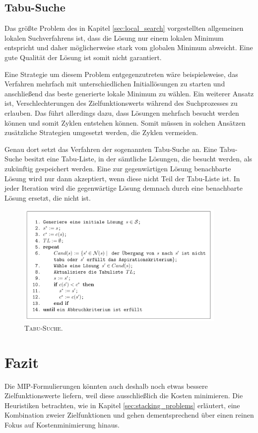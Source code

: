\pagebreak

\subsection{Tabu-Suche}
\label{sec:tabu_seach}

Das größte Problem des in Kapitel \ref{sec:local_search} vorgestellten allgemeinen lokalen Suchverfahrens
ist, dass die Lösung nur einem lokalen Minimum entspricht und daher möglicherweise stark vom globalen
Minimum abweicht. Eine gute Qualität der Lösung ist somit nicht garantiert.

Eine Strategie um diesem Problem entgegenzutreten wäre beispielsweise, das Verfahren mehrfach mit unterschiedlichen
Initiallösungen zu starten und anschließend das beste generierte lokale Minimum zu wählen.
Ein weiterer Ansatz ist, Verschlechterungen des Zielfunktionswerts während des Suchprozesses zu erlauben.
Das führt allerdings dazu, dass Lösungen mehrfach besucht werden können und somit Zyklen entstehen können.
Somit müssen in solchen Ansätzen zusätzliche Strategien umgesetzt werden, die Zyklen vermeiden. \cite{Brucker2006}

Genau dort setzt das Verfahren der sogenannten Tabu-Suche an. Eine Tabu-Suche besitzt eine Tabu-Liste,
in der sämtliche Lösungen, die besucht werden, als zukünftig  gespeichert werden.
Eine zur gegenwärtigen Lösung benachbarte Lösung wird nur dann akzeptiert, wenn diese nicht Teil der Tabu-Liste ist.
In jeder Iteration wird die gegenwärtige Lösung demnach durch eine benachbarte Lösung ersetzt, die nicht  ist.

\begin{figure}[H]
\centering
\includegraphics[width=0.9\textwidth]{img/tabu_search_algo_placeholder.png}
\caption{\textsc{Tabu-Suche. \cite{Knust2017}}}
\label{fig:local_search_weakness}
\end{figure}

\pagebreak

\section{Fazit}
\label{sec:conclusion}

Die MIP-Formulierungen könnten auch deshalb noch etwas bessere Zielfunktionswerte liefern, weil
diese ausschließlich die Kosten minimieren.
Die Heuristiken betrachten, wie in Kapitel \ref{sec:stacking_problems} erläutert, eine Kombination zweier Zielfunktionen
und gehen dementsprechend über einen reinen Fokus auf Kostenminimierung hinaus.
